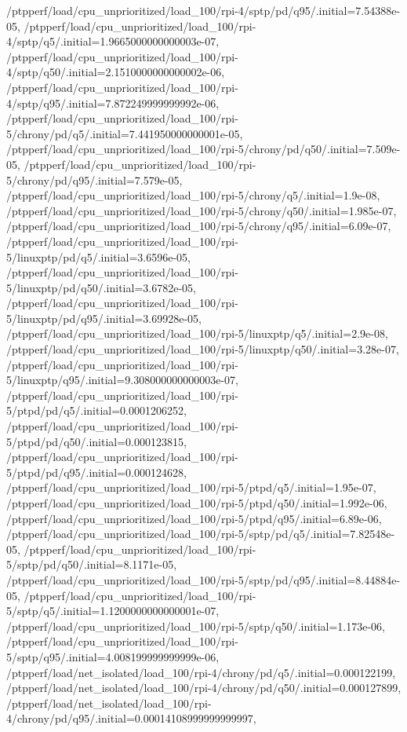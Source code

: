 {    /ptpperf/load/cpu_unprioritized/load_100/rpi-4/sptp/pd/q95/.initial=7.54388e-05,
    /ptpperf/load/cpu_unprioritized/load_100/rpi-4/sptp/q5/.initial=1.9665000000000003e-07,
    /ptpperf/load/cpu_unprioritized/load_100/rpi-4/sptp/q50/.initial=2.1510000000000002e-06,
    /ptpperf/load/cpu_unprioritized/load_100/rpi-4/sptp/q95/.initial=7.872249999999992e-06,
    /ptpperf/load/cpu_unprioritized/load_100/rpi-5/chrony/pd/q5/.initial=7.441950000000001e-05,
    /ptpperf/load/cpu_unprioritized/load_100/rpi-5/chrony/pd/q50/.initial=7.509e-05,
    /ptpperf/load/cpu_unprioritized/load_100/rpi-5/chrony/pd/q95/.initial=7.579e-05,
    /ptpperf/load/cpu_unprioritized/load_100/rpi-5/chrony/q5/.initial=1.9e-08,
    /ptpperf/load/cpu_unprioritized/load_100/rpi-5/chrony/q50/.initial=1.985e-07,
    /ptpperf/load/cpu_unprioritized/load_100/rpi-5/chrony/q95/.initial=6.09e-07,
    /ptpperf/load/cpu_unprioritized/load_100/rpi-5/linuxptp/pd/q5/.initial=3.6596e-05,
    /ptpperf/load/cpu_unprioritized/load_100/rpi-5/linuxptp/pd/q50/.initial=3.6782e-05,
    /ptpperf/load/cpu_unprioritized/load_100/rpi-5/linuxptp/pd/q95/.initial=3.69928e-05,
    /ptpperf/load/cpu_unprioritized/load_100/rpi-5/linuxptp/q5/.initial=2.9e-08,
    /ptpperf/load/cpu_unprioritized/load_100/rpi-5/linuxptp/q50/.initial=3.28e-07,
    /ptpperf/load/cpu_unprioritized/load_100/rpi-5/linuxptp/q95/.initial=9.308000000000003e-07,
    /ptpperf/load/cpu_unprioritized/load_100/rpi-5/ptpd/pd/q5/.initial=0.0001206252,
    /ptpperf/load/cpu_unprioritized/load_100/rpi-5/ptpd/pd/q50/.initial=0.000123815,
    /ptpperf/load/cpu_unprioritized/load_100/rpi-5/ptpd/pd/q95/.initial=0.000124628,
    /ptpperf/load/cpu_unprioritized/load_100/rpi-5/ptpd/q5/.initial=1.95e-07,
    /ptpperf/load/cpu_unprioritized/load_100/rpi-5/ptpd/q50/.initial=1.992e-06,
    /ptpperf/load/cpu_unprioritized/load_100/rpi-5/ptpd/q95/.initial=6.89e-06,
    /ptpperf/load/cpu_unprioritized/load_100/rpi-5/sptp/pd/q5/.initial=7.82548e-05,
    /ptpperf/load/cpu_unprioritized/load_100/rpi-5/sptp/pd/q50/.initial=8.1171e-05,
    /ptpperf/load/cpu_unprioritized/load_100/rpi-5/sptp/pd/q95/.initial=8.44884e-05,
    /ptpperf/load/cpu_unprioritized/load_100/rpi-5/sptp/q5/.initial=1.1200000000000001e-07,
    /ptpperf/load/cpu_unprioritized/load_100/rpi-5/sptp/q50/.initial=1.173e-06,
    /ptpperf/load/cpu_unprioritized/load_100/rpi-5/sptp/q95/.initial=4.008199999999999e-06,
    /ptpperf/load/net_isolated/load_100/rpi-4/chrony/pd/q5/.initial=0.000122199,
    /ptpperf/load/net_isolated/load_100/rpi-4/chrony/pd/q50/.initial=0.000127899,
    /ptpperf/load/net_isolated/load_100/rpi-4/chrony/pd/q95/.initial=0.00014108999999999997,
}
